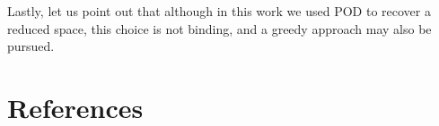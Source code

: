 \documentclass{elsarticle}
\numberwithin{equation}{section}
\theoremstyle{theorem}
\theoremstyle{definition}
\theoremstyle{remark}
\theoremstyle{proposition}
\numberwithin{figure}{section}
\begin{document}
		Lastly, let us point out that although in this work we used POD to recover a reduced space, this choice is not binding, and a greedy approach may also be pursued. 
		
		
		
	
	
	\clearpage
	
	\section*{References}
		
\end{document}
